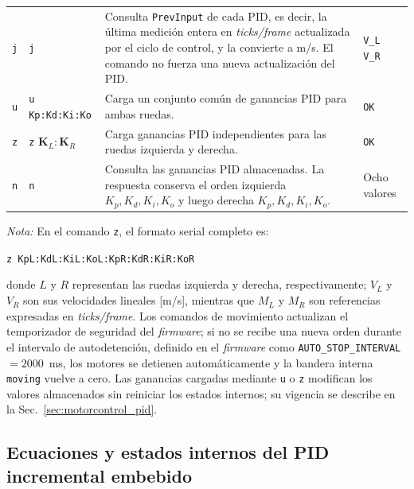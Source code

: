 \begin{appendices}
\begin{table}[H]
\begin{tabular}{c p{2.7cm} p{6.8cm} p{2.2cm}}
\texttt{j} &
\texttt{j} &
Consulta \texttt{PrevInput} de cada PID, es decir, la última medición entera en \textit{ticks/frame} actualizada por el ciclo de control, y la convierte a m/s. El comando no fuerza una nueva actualización del PID. &
\texttt{V\_L V\_R} \\

\texttt{u} &
\texttt{u Kp:Kd:Ki:Ko} &
Carga un conjunto común de ganancias PID para ambas ruedas. &
\texttt{OK} \\

\texttt{z} &
\texttt{z} $\mathbf{K}_L:\mathbf{K}_R$ &
Carga ganancias PID independientes para las ruedas izquierda y derecha. &
\texttt{OK} \\

\texttt{n} &
\texttt{n} &
Consulta las ganancias PID almacenadas. La respuesta conserva el orden izquierda $K_p,K_d,K_i,K_o$ y luego derecha $K_p,K_d,K_i,K_o$. &
Ocho valores \\

\bottomrule
\end{tabular}
\vspace{0.2cm}

\begin{minipage}{0.96\textwidth}
\footnotesize
\textit{Nota:} En el comando \texttt{z}, el formato serial completo es:

\begin{center}
\texttt{z KpL:KdL:KiL:KoL:KpR:KdR:KiR:KoR}
\end{center}
\end{minipage}
\end{table}

\noindent donde $L$ y $R$ representan las ruedas izquierda y derecha, respectivamente; $V_L$ y $V_R$ son sus velocidades lineales [m/s], mientras que $M_L$ y $M_R$ son referencias expresadas en \textit{ticks/frame}. Los comandos de movimiento actualizan el temporizador de seguridad del \textit{firmware}; si no se recibe una nueva orden durante el intervalo de autodetención, definido en el \textit{firmware} como \texttt{AUTO\_STOP\_INTERVAL}$=2000$~ms, los motores se detienen automáticamente y la bandera interna \texttt{moving} vuelve a cero. Las ganancias cargadas mediante \texttt{u} o \texttt{z} modifican los valores almacenados sin reiniciar los estados internos; su vigencia se describe en la Sec.~\ref{sec:motorcontrol_pid}.

\subsection{Ecuaciones y estados internos del PID incremental embebido}
\label{anx:pid_ecuaciones}


\end{appendices}
